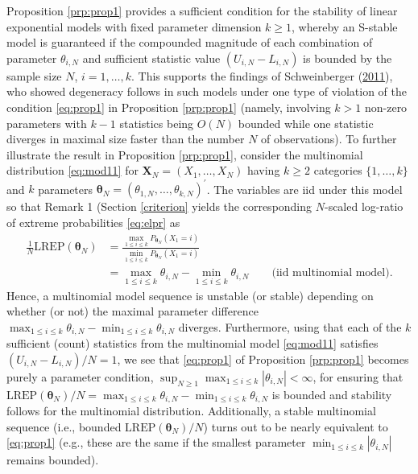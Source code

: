 \documentclass[]{article}
\theoremstyle{definition}
\newcommand{\REP}{\mathrm{LREP}}
\begin{document}
Proposition \ref{prp:prop1} provides a sufficient condition for the
stability of linear exponential models with fixed parameter dimension
\(k\geq 1\), whereby an S-stable model is guaranteed if the compounded
magnitude of each combination of parameter \(\theta_{i,N}\) and
sufficient statistic value \((U_{i,N}-L_{i,N})\) is bounded by the
sample size \(N\), \(i=1,\ldots,k\). This supports the findings of
Schweinberger
(\protect\hyperlink{ref-schweinberger2011instability}{2011}), who showed
degeneracy follows in such models under one type of violation of the
condition \eqref{eq:prop1} in Proposition \ref{prp:prop1} (namely,
involving \(k>1\) non-zero parameters with \(k-1\) statistics being
\(O(N)\) bounded while one statistic diverges in maximal size faster
than the number \(N\) of observations). To further illustrate the result
in Proposition \ref{prp:prop1}, consider the multinomial distribution
\eqref{eq:mod11} for \(\boldsymbol X_N=(X_1,\ldots,X_N)\) having
\(k\geq 2\) categories \(\{1,\ldots,k\}\) and \(k\) parameters
\(\boldsymbol \theta_N = (\theta_{1,N},\ldots,\theta_{k,N})^\prime\).
The variables are iid under this model so that Remark 1 (Section
\ref{criterion} yields the corresponding \(N\)-scaled log-ratio of
extreme probabilities \eqref{eq:elpr} as
\begin{align*}
  \frac{1}{N}\REP(\boldsymbol \theta_N) &= \frac{\max_{1 \leq i \leq k} P_{\boldsymbol \theta_N}(X_1=i)}{\min_{1 \leq i \leq k} P_{\boldsymbol \theta_N}(X_1=i)}\\
  &= \max_{1 \leq i \leq k} \theta_{i,N} - \min_{1 \leq i \leq k} \theta_{i,N} \qquad \text{(iid multinomial model)}.
\end{align*}
Hence, a multinomial model sequence is unstable (or stable) depending on
whether (or not) the maximal parameter difference
\(\max_{1 \leq i \leq k} \theta_{i,N} - \min_{1 \leq i \leq k} \theta_{i,N}\)
diverges. Furthermore, using that each of the \(k\) sufficient (count)
statistics from the multinomial model \eqref{eq:mod11} satisfies
\((U_{i,N}-L_{i,N})/N=1\), we see that \eqref{eq:prop1} of Proposition
\ref{prp:prop1} becomes purely a parameter condition,
\(\sup_{N \geq 1}\max_{1 \leq i \leq k } |\theta_{i,N}| <\infty\), for
ensuring that
\(\REP(\boldsymbol \theta_N)/N =\max_{1 \leq i \leq k} \theta_{i,N} - \min_{1 \leq i \leq k} \theta_{i,N}\)
is bounded and stability follows for the multinomial distribution.
Additionally, a stable multinomial sequence (i.e., bounded
\(\REP(\boldsymbol \theta_N)/N\)) turns out to be nearly equivalent to
\eqref{eq:prop1} (e.g., these are the same if the smallest parameter
\(\min_{1 \leq i \leq k } |\theta_{i,N}|\) remains bounded).
\end{document}
